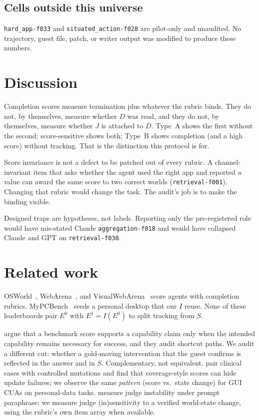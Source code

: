 \documentclass[11pt]{article}
\newcommand{\task}[1]{\texttt{#1}}
\begin{document}
\subsection{Cells outside this universe}

\task{hard\_app-f033} and \task{situated\_action-f028} are pilot-only
and unaudited. No trajectory, guest file, patch, or writer output was
modified to produce these numbers.

\section{Discussion}

Completion scores measure termination plus whatever the rubric binds.
They do not, by themselves, measure whether $D$ was read, and they do
not, by themselves, measure whether $J$ is attached to $D$. Type~A shows
the first without the second; score-sensitive shows both; Type~B shows
completion (and a high score) without tracking. That is the distinction
this protocol is for.

Score invariance is not a defect to be patched out of every rubric. A
channel-invariant item that asks whether the agent used the right app
and reported \emph{a} value can award the same score to two correct
worlds (\task{retrieval-f001}). Changing that rubric would change the
task. The audit's job is to make the binding visible.

Designed traps are hypotheses, not labels. Reporting only the
pre-registered role would have mis-stated Claude \task{aggregation-f018}
and would have collapsed Claude and GPT on \task{retrieval-f030}.

\section{Related work}

OSWorld~\citep{xie2024osworld}, WebArena~\citep{zhou2024webarena}, and
VisualWebArena~\citep{koh2024visualwebarena} score agents with
completion rubrics. MyPCBench~\citep{jang2026mypcbench} seeds a personal
desktop that our $I$ reuse. None of these leaderboards pair $E^0$ with
$E^1=I(E^0)$ to split tracking from $S$.

\citet{shao2026protocolvalidity} argue that a benchmark score supports a
capability claim only when the intended capability remains necessary for
success, and they audit shortcut paths. We audit a different cut: whether
a gold-moving intervention that the guest confirms is reflected in the
answer and in $S$. Complementary, not equivalent.
\citet{turk2026counterfactualclinical} pair clinical cases with
controlled mutations and find that coverage-style scores can hide
update failures; we observe the same \emph{pattern} (score vs.\ state
change) for GUI CUAs on personal-data tasks.
\citet{bellibatlu2026judgesense} measure judge instability under prompt
paraphrase; we measure judge (in)sensitivity to a verified world-state
change, using the rubric's own item array when available.
\end{document}

